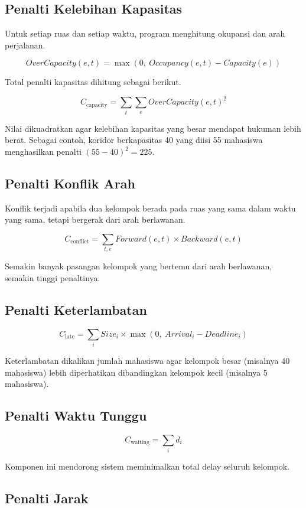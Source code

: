 \documentclass[11pt,a4paper]{article}
\begin{document}
\subsection{Penalti Kelebihan Kapasitas}

Untuk setiap ruas dan setiap waktu, program menghitung okupansi dan arah perjalanan.

\[
OverCapacity(e, t) = \max(0,\ Occupancy(e, t) - Capacity(e))
\]

Total penalti kapasitas dihitung sebagai berikut.

\[
C_{\mathrm{capacity}} = \sum_t \sum_e OverCapacity(e, t)^2
\]

Nilai dikuadratkan agar kelebihan kapasitas yang besar mendapat hukuman lebih berat. Sebagai contoh, koridor berkapasitas 40 yang diisi 55 mahasiswa menghasilkan penalti $(55-40)^2 = 225$.

\subsection{Penalti Konflik Arah}

Konflik terjadi apabila dua kelompok berada pada ruas yang sama dalam waktu yang sama, tetapi bergerak dari arah berlawanan.

\[
C_{\mathrm{conflict}} = \sum_{t, e} Forward(e, t) \times Backward(e, t)
\]

Semakin banyak pasangan kelompok yang bertemu dari arah berlawanan, semakin tinggi penaltinya.

\subsection{Penalti Keterlambatan}

\[
C_{\mathrm{late}} = \sum_i Size_i \times \max(0,\ Arrival_i - Deadline_i)
\]

Keterlambatan dikalikan jumlah mahasiswa agar kelompok besar (misalnya 40 mahasiswa) lebih diperhatikan dibandingkan kelompok kecil (misalnya 5 mahasiswa).

\subsection{Penalti Waktu Tunggu}

\[
C_{\mathrm{waiting}} = \sum_i d_i
\]

Komponen ini mendorong sistem meminimalkan total delay seluruh kelompok.

\subsection{Penalti Jarak}
\end{document}
